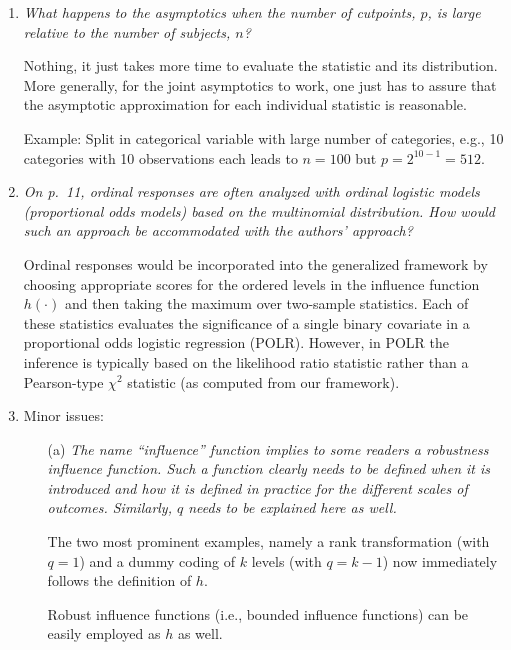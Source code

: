 \documentclass[11pt,a4paper]{article}
\begin{document}
\begin{enumerate}
  \item \textit{What happens to the asymptotics when the number of cutpoints, $p$,
        is large relative to the number of subjects, $n$?}
	
	Nothing, it just takes more time to evaluate the statistic and its distribution.	
        More generally, for the joint asymptotics to work, one just has to assure that the
	asymptotic approximation for each individual statistic is reasonable.

	Example: Split in categorical variable with large number of categories, e.g.,
	10 categories with 10 observations each leads to $n = 100$ but
	$p = 2^{10 - 1} = 512$.
	
  \item \textit{On p.~11, ordinal responses are often analyzed with ordinal
        logistic models (proportional odds models) based on the multinomial
	distribution. How would such an approach be accommodated with the
	authors' approach?}
	
	Ordinal responses would be incorporated into the generalized framework
	by choosing appropriate scores for the ordered levels in the influence
	function $h(\cdot)$ and then taking the maximum over two-sample statistics.
	Each of these statistics evaluates the significance of a single binary
	covariate in a proportional odds logistic regression (POLR). However, in
	POLR the inference is typically based on the likelihood ratio statistic
	rather than a Pearson-type $\chi^2$ statistic (as computed from our
	framework).
	
  \item Minor issues:
  
  \begin{itemize}
  
    \item[(a)] \textit{The name ``influence'' function implies to some readers a
               robustness influence function. Such a function clearly needs to be
	       defined when it is introduced and how it is defined in practice
	       for the different scales of outcomes. Similarly, $q$ needs to be
	       explained here as well.}
	       
	       The two most prominent examples, namely a rank transformation
               (with $q = 1$) and a dummy coding of $k$ levels (with $q = k - 1$)
               now immediately follows the definition of $h$. 
	       
	       Robust influence functions (i.e., bounded influence functions) can
	       be easily employed as $h$ as well.
	       

\end{itemize}
\end{enumerate}
\end{document}
